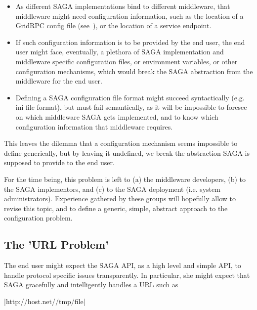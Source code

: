    \begin{itemize}

     \item As different SAGA implementations bind to different
     middleware, that middleware might need configuration
     information, such as the location of a GridRPC config file
     (see~\cite{gridrpc}), or the location of a service
     endpoint.

     \item If such configuration information is to be
     provided by the end user, the end user might face,
     eventually, a plethora of SAGA implementation and
     middleware specific configuration files, or environment
     variables, or other configuration mechanisms, which
     would break the SAGA abstraction from the middleware
     for the end user.

     \item Defining a SAGA configuration file format might
     succeed syntactically (e.g. ini file format), but must
     fail semantically, as it will be impossible to foresee on
     which middleware SAGA gets implemented, and to know which
     configuration information that middleware requires.

   \end{itemize}

   This leaves the dilemma that a configuration mechanism seems
   impossible to define generically, but by leaving it
   undefined, we break the abstraction SAGA is supposed to
   provide to the end user.

   For the time being,  this problem is
   left to (a) the middleware developers, (b) to the SAGA
   implementors, and (c) to the SAGA deployment (i.e. system
   administrators).   Experience gathered by
   these groups will hopefully allow  to revise
   this topic, and to define a generic, simple,  abstract
   approach to the configuration problem.


  \subsection{The 'URL Problem'}
  \label{ssec:urlprob}

  The end user might expect the SAGA API, as a high level and
  simple API, to handle protocol specific issues transparently.
  In particular, she might expect that SAGA gracefully and
  intelligently handles a URL such as

   \shift |http://host.net//tmp/file|

